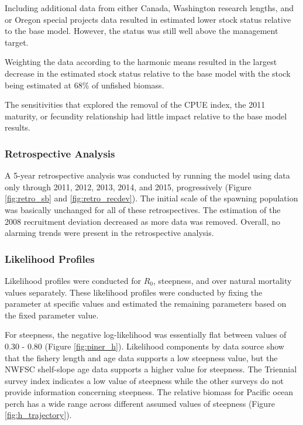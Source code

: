 \documentclass[12pt,]{article}
\begin{document}
Including additional data from either Canada, Washington research
lengths, and or Oregon special projects data resulted in estimated lower
stock status relative to the base model. However, the status was still
well above the management target.

Weighting the data according to the harmonic means resulted in the
largest decrease in the estimated stock status relative to the base
model with the stock being estimated at 68\% of unfished biomass.

The sensitivities that explored the removal of the CPUE index, the 2011
maturity, or fecundity relationship had little impact relative to the
base model results.

\subsubsection{Retrospective Analysis}\label{retrospective-analysis}

A 5-year retrospective analysis was conducted by running the model using
data only through 2011, 2012, 2013, 2014, and 2015, progressively
(Figure \ref{fig:retro_sb} and \ref{fig:retro_recdev}). The initial
scale of the spawning population was basically unchanged for all of
these retrospectives. The estimation of the 2008 recruitment deviation
decreased as more data was removed. Overall, no alarming trends were
present in the retrospective analysis.

\subsubsection{Likelihood Profiles}\label{likelihood-profiles}

Likelihood profiles were conducted for \(R_0\), steepness, and over
natural mortality values separately. These likelihood profiles were
conducted by fixing the parameter at specific values and estimated the
remaining parameters based on the fixed parameter value.

For steepness, the negative log-likelihood was essentially flat between
values of 0.30 - 0.80 (Figure \ref{fig:piner_h}). Likelihood components
by data source show that the fishery length and age data supports a low
steepness value, but the NWFSC shelf-slope age data supports a higher
value for steepness. The Triennial survey index indicates a low value of
steepness while the other surveys do not provide information concerning
steepness. The relative biomass for Pacific ocean perch has a wide range
across different assumed values of steepness (Figure
\ref{fig:h_trajectory}).
\end{document}
